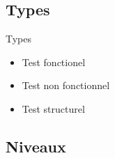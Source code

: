 \documentclass{beamer}
\begin{document}
\subsection{Types}

\begin{frame}{Types}
  \begin{itemize}
    
  \item{Test fonctionel\pause}
  \item{Test non fonctionnel\pause}
  \item{Test structurel}
    
  \end{itemize}
\end{frame}

\subsection{Niveaux}
\end{document}
